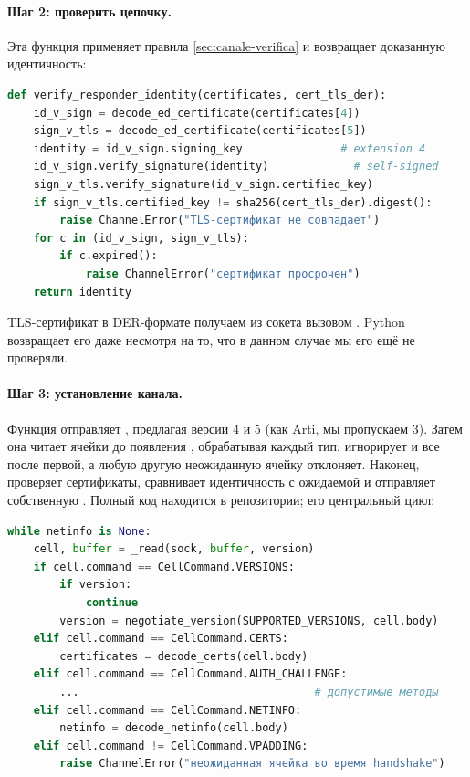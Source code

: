 \paragraph{Шаг 2: проверить цепочку.} Эта функция применяет правила \cref{sec:canale-verifica} и возвращает доказанную идентичность:

\begin{lstlisting}[language=Python]
def verify_responder_identity(certificates, cert_tls_der):
    id_v_sign = decode_ed_certificate(certificates[4])
    sign_v_tls = decode_ed_certificate(certificates[5])
    identity = id_v_sign.signing_key               # extension 4
    id_v_sign.verify_signature(identity)             # self-signed
    sign_v_tls.verify_signature(id_v_sign.certified_key)
    if sign_v_tls.certified_key != sha256(cert_tls_der).digest():
        raise ChannelError("TLS-сертификат не совпадает")
    for c in (id_v_sign, sign_v_tls):
        if c.expired():
            raise ChannelError("сертификат просрочен")
    return identity
\end{lstlisting}

TLS-сертификат в DER-формате получаем из сокета вызовом . Python возвращает его даже несмотря на то, что в данном случае мы его ещё не проверяли.

\paragraph{Шаг 3: установление канала.} Функция  отправляет , предлагая версии 4 и 5 (как Arti, мы пропускаем 3). Затем она читает ячейки до появления , обрабатывая каждый тип: игнорирует  и все  после первой, а любую другую неожиданную ячейку отклоняет. Наконец, проверяет сертификаты, сравнивает идентичность с ожидаемой и отправляет собственную . Полный код находится в репозитории; его центральный цикл:

\begin{lstlisting}[language=Python]
while netinfo is None:
    cell, buffer = _read(sock, buffer, version)
    if cell.command == CellCommand.VERSIONS:
        if version:
            continue
        version = negotiate_version(SUPPORTED_VERSIONS, cell.body)
    elif cell.command == CellCommand.CERTS:
        certificates = decode_certs(cell.body)
    elif cell.command == CellCommand.AUTH_CHALLENGE:
        ...                                    # допустимые методы
    elif cell.command == CellCommand.NETINFO:
        netinfo = decode_netinfo(cell.body)
    elif cell.command != CellCommand.VPADDING:
        raise ChannelError("неожиданная ячейка во время handshake")
\end{lstlisting}

